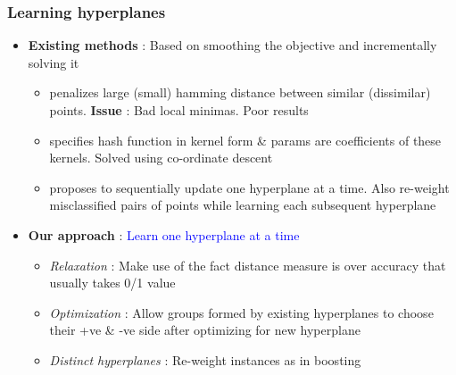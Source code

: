 \documentclass[usenames,dvipsnames, 11pt]{beamer}
\newlength{\wideitemsep}
\let\olditem\item
\renewcommand{\item}{\setlength{\itemsep}{\wideitemsep}\olditem}
\begin{document}
\begin{frame}
\frametitle{Learning hyperplanes}
\pause
\begin{itemize}
\item \textbf{Existing methods} : Based on smoothing the objective and incrementally solving it
\pause
\begin{itemize}
\item \cite{norouzi2011minimal} penalizes large (small) hamming distance between similar (dissimilar) points. \textbf{Issue} : Bad local minimas. Poor results
\pause
\item \cite{kulis2009learning} specifies hash function in kernel form \& params are coefficients of these kernels. Solved using co-ordinate descent
\pause
\item \cite{wang2010sequential} proposes to sequentially update one hyperplane at a time. Also re-weight misclassified pairs of points while learning each subsequent hyperplane
\end{itemize}
\pause
\item \textbf{Our approach} : \textcolor{Blue}{Learn one hyperplane at a time}
\pause
\begin{itemize}
\item \emph{Relaxation} : Make use of the fact distance measure is over accuracy that usually takes 0/1 value
\item \emph{Optimization} : Allow groups formed by existing hyperplanes to choose their +ve \& -ve side after  optimizing for new hyperplane
\item \emph{Distinct hyperplanes} : Re-weight instances as in boosting
\end{itemize}
\end{itemize}
\end{frame}
\end{document}
